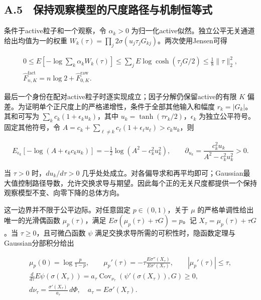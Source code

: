 \documentclass[11pt,a4paper]{article}
\begin{document}
\subsection*{A.5　保持观察模型的尺度路径与机制恒等式}\label{a.5-ux4fddux6301ux89c2ux5bdfux6a21ux578bux7684ux5c3aux5ea6ux8defux5f84ux4e0eux673aux5236ux6052ux7b49ux5f0f}

条件于active粒子和一个观察，令 \(\alpha_k>0\)
为归一化active似然。独立公平无关通道给出均值为一的权重
\(W_k(\tau)=\prod_j2\sigma(u_j\tau_jG_{kj})\)。两次使用Jensen可得

\[
\begin{gathered}
0\le E[-\log\sum_k\alpha_kW_k(\tau)]
\le\sum_jE\log\cosh(\tau_jG/2)\le\frac18\|\tau\|_2^2,\\
\widehat F^{\mathrm{fact}}_{n,K}=n\log2+\widehat F^{\mathrm{raw}}_{0,K}.
\end{gathered}
\tag{A.29}
\]

最后一个身份在配对active粒子时逐实现成立；因子分解仍保留active的有限
\(K\) 偏差。为证明单个正尺度上的严格递增性，条件于全部其他输入和幅度
\(r_k=|G_k|\)。其和可写为 \(\sum_kc_k(1+\epsilon_ku_k)\)，其中
\(u_k=\tanh(\tau r_k/2)\)，\(\epsilon_k\)
为独立公平符号。固定其他符号，令
\(A=c_k+\sum_{\ell\ne k}c_\ell(1+\epsilon_\ell u_\ell)>c_ku_k\)，则

\[
E_{\epsilon_k}[-\log(A+\epsilon_kc_ku_k)]
=-\tfrac12\log(A^2-c_k^2u_k^2),\qquad
\partial_{u_k}=\frac{c_k^2u_k}{A^2-c_k^2u_k^2}>0 .
\]

当 \(\tau>0\) 时，\(du_k/d\tau>0\)
几乎处处成立。对各偏导求和再平均即可；Gaussian最大值控制路径导数，允许交换求导与期望。因此每个正的无关尺度都提供一个保持观察模型不变、向零下降的总体方向。

这一边界并不限于公平边际。对任意固定 \(p\in(0,1)\)，关于 \(\mu\)
的严格单调性给出唯一的光滑偶函数 \(\mu_p(\tau)\)，满足
\(E\sigma(\mu_p(\tau)+\tau G)=p\)。记 \(X_\tau=\mu_p(\tau)+\tau G\)。当
\(\tau\ge0\)，且可微凸函数 \(\psi\)
满足交换求导所需的可积性时，隐函数定理与Gaussian分部积分给出

\[
\begin{gathered}
\mu_p(0)=\log\frac p{1-p},\qquad
\mu_p'(\tau)=-\tau\frac{E\sigma''(X_\tau)}{E\sigma'(X_\tau)},\qquad
|\mu_p'(\tau)|\le\tau,\\
\frac d{d\tau}E\psi(\sigma(X_\tau))
=a_\tau\operatorname{Cov}_{\nu_\tau}(\psi'(\sigma(X_\tau)),G)\ge0,\\
d\nu_\tau=\frac{\sigma'(X_\tau)}{a_\tau}\,d\Phi,\quad a_\tau=E\sigma'(X_\tau).
\end{gathered}
\tag{A.30}
\]
\end{document}
